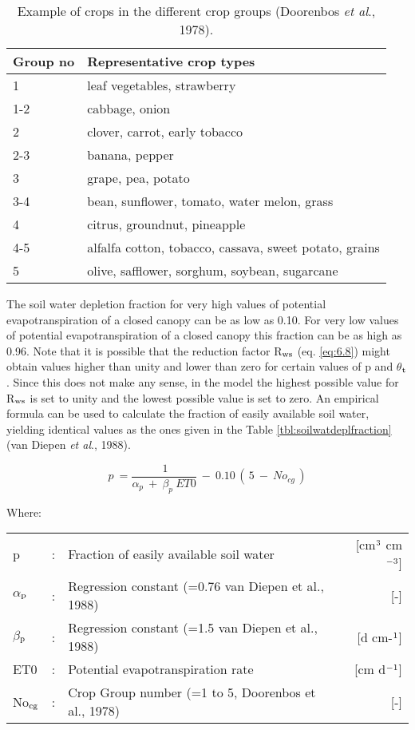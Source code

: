 \begin{table}
\caption{Example of crops in the different crop groups (Doorenbos {\it et al}., 1978).}
\label{tbl:ExampleCropGroups}
\begin{tabularx}{\textwidth}{lX}
\hline
Group no & Representative crop types\\
\hline
1 & leaf vegetables, strawberry\\     
1-2 & cabbage, onion\\
2 & clover, carrot, early tobacco\\     
2-3 & banana, pepper\\
3 & grape, pea, potato\\
3-4 & bean, sunflower, tomato, water melon, grass\\
4 & citrus, groundnut, pineapple\\
4-5 & alfalfa cotton, tobacco, cassava, sweet potato, grains\\
5 & olive, safflower, sorghum, soybean, sugarcane\\
\hline
\end{tabularx}
\end{table}

The soil water depletion fraction for very high values of potential evapotranspiration of a
closed canopy can be as low as 0.10. For very low values of potential evapotranspiration
of a closed canopy this fraction can be as high as 0.96.
Note that it is possible that the reduction factor R$_{{\rm ws}}$ (eq. \ref{eq:6.8}) might obtain 
values higher
than unity and lower than zero for certain values of p and $\theta$$_{{\rm t}}$. Since this does not make
any sense, in the model the highest possible value for R$_{{\rm ws}}$ is set to unity and the lowest
possible value is set to zero.
An empirical formula can be used to calculate the fraction of easily available soil water,
yielding identical values as the ones given in the Table \ref{tbl:soilwatdeplfraction} 
(van Diepen {\it et al}., 1988).

\begin{equation}
\label{eq:6.10}
p~={\frac{~1}{ \alpha _{p} ~+~ \beta _{p} ~ET0}} ~-~ 0.10\, (\, 5~-~No _{cg} \, )
\end{equation}

Where:\\[5pt]
\begin{tabularx}{\textwidth}{llXr}
p &:& Fraction of easily available soil water  & [cm$^{{\rm 3}}$ cm$^{{\rm -3}}$]\\
$\alpha$$_{{\rm p}}$ &:& Regression constant {\small (=0.76 van Diepen et al., 1988)}  & [-]\\
$\beta$$_{{\rm p}}$ &:& Regression constant {\small (=1.5 van Diepen et al., 1988)}  & [d cm-$^{{\rm 1}}$]\\
ET0 &:& Potential evapotranspiration rate  & [cm d$^{{\rm -1}}$]\\
No$_{{\rm cg}}$ &:& Crop Group number {\small (=1 to 5, Doorenbos et al., 1978)}  & [-]\\
\end{tabularx}
 
